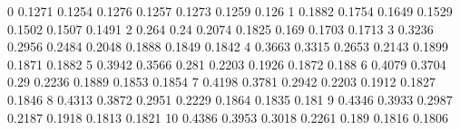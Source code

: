 0	0.1271	0.1254	0.1276	0.1257	0.1273	0.1259	0.126
1	0.1882	0.1754	0.1649	0.1529	0.1502	0.1507	0.1491
2	0.264	0.24	0.2074	0.1825	0.169	0.1703	0.1713
3	0.3236	0.2956	0.2484	0.2048	0.1888	0.1849	0.1842
4	0.3663	0.3315	0.2653	0.2143	0.1899	0.1871	0.1882
5	0.3942	0.3566	0.281	0.2203	0.1926	0.1872	0.188
6	0.4079	0.3704	0.29	0.2236	0.1889	0.1853	0.1854
7	0.4198	0.3781	0.2942	0.2203	0.1912	0.1827	0.1846
8	0.4313	0.3872	0.2951	0.2229	0.1864	0.1835	0.181
9	0.4346	0.3933	0.2987	0.2187	0.1918	0.1813	0.1821
10	0.4386	0.3953	0.3018	0.2261	0.189	0.1816	0.1806
